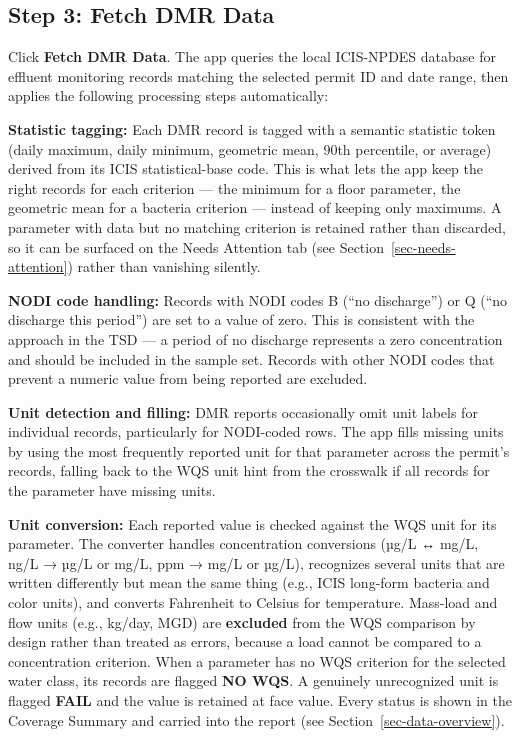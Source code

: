 \documentclass[
  11pt,
  letterpaper,
  DIV=11,
  numbers=noendperiod]{scrartcl}
\begin{document}
\subsection{Step 3: Fetch DMR Data}\label{sec-fetch-dmr}

Click \textbf{Fetch DMR Data}. The app queries the local ICIS-NPDES
database for effluent monitoring records matching the selected permit ID
and date range, then applies the following processing steps
automatically:

\textbf{Statistic tagging:} Each DMR record is tagged with a semantic
statistic token (daily maximum, daily minimum, geometric mean, 90th
percentile, or average) derived from its ICIS statistical-base code.
This is what lets the app keep the right records for each criterion ---
the minimum for a floor parameter, the geometric mean for a bacteria
criterion --- instead of keeping only maximums. A parameter with data
but no matching criterion is retained rather than discarded, so it can
be surfaced on the Needs Attention tab (see
Section~\ref{sec-needs-attention}) rather than vanishing silently.

\textbf{NODI code handling:} Records with NODI codes B (``no
discharge'') or Q (``no discharge this period'') are set to a value of
zero. This is consistent with the approach in the TSD --- a period of no
discharge represents a zero concentration and should be included in the
sample set. Records with other NODI codes that prevent a numeric value
from being reported are excluded.

\textbf{Unit detection and filling:} DMR reports occasionally omit unit
labels for individual records, particularly for NODI-coded rows. The app
fills missing units by using the most frequently reported unit for that
parameter across the permit's records, falling back to the WQS unit hint
from the crosswalk if all records for the parameter have missing units.

\textbf{Unit conversion:} Each reported value is checked against the WQS
unit for its parameter. The converter handles concentration conversions
(µg/L ↔ mg/L, ng/L → µg/L or mg/L, ppm → mg/L or µg/L), recognizes
several units that are written differently but mean the same thing
(e.g., ICIS long-form bacteria and color units), and converts Fahrenheit
to Celsius for temperature. Mass-load and flow units (e.g., kg/day, MGD)
are \textbf{excluded} from the WQS comparison by design rather than
treated as errors, because a load cannot be compared to a concentration
criterion. When a parameter has no WQS criterion for the selected water
class, its records are flagged \textbf{NO WQS}. A genuinely unrecognized
unit is flagged \textbf{FAIL} and the value is retained at face value.
Every status is shown in the Coverage Summary and carried into the
report (see Section~\ref{sec-data-overview}).
\end{document}
